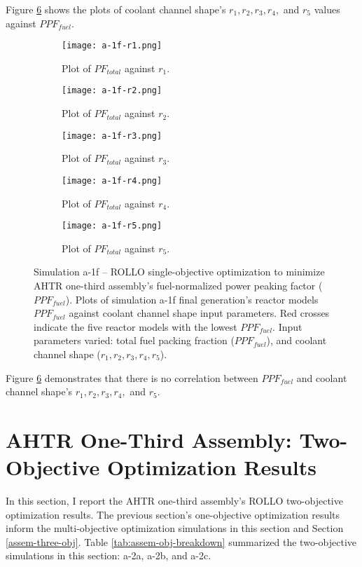 Figure \ref{fig:a-1f} shows the plots of coolant channel shape's 
$r_1, r_2, r_3, r_4,$ and $r_5$ values against $PPF_{fuel}$. 
\begin{figure}[htbp!]
    \centering
    \begin{subfigure}{0.49\textwidth}
        \texttt{[image: a-1f-r1.png]}
        \caption{Plot of $PF_{total}$ against $r_1$.}
        \label{fig:a-1f-r1} 
    \end{subfigure}
    \begin{subfigure}{0.49\textwidth}
        \texttt{[image: a-1f-r2.png]}
        \caption{Plot of $PF_{total}$ against $r_2$.}
        \label{fig:a-1f-r2} 
    \end{subfigure}
    \begin{subfigure}{0.49\textwidth}
        \texttt{[image: a-1f-r3.png]}
        \caption{Plot of $PF_{total}$ against $r_3$.}
        \label{fig:a-1f-r3} 
    \end{subfigure}
    \begin{subfigure}{0.49\textwidth}
        \texttt{[image: a-1f-r4.png]}
        \caption{Plot of $PF_{total}$ against $r_4$.}
        \label{fig:a-1f-r4} 
    \end{subfigure}
    \begin{subfigure}{0.49\textwidth}
        \texttt{[image: a-1f-r5.png]}
        \caption{Plot of $PF_{total}$ against $r_5$.}
        \label{fig:a-1f-r5} 
    \end{subfigure}
    \caption{Simulation a-1f -- ROLLO single-objective optimization to minimize 
    AHTR one-third assembly's fuel-normalized power peaking factor ($PPF_{fuel}$). 
    Plots of simulation a-1f final generation's reactor models $PPF_{fuel}$ against 
    coolant channel shape input parameters. 
    Red crosses indicate the five reactor models with the lowest $PPF_{fuel}$.
    Input parameters varied: total fuel packing fraction 
    ($PPF_{fuel}$), and coolant channel shape ($r_1, r_2, r_3, r_4, r_5$).}
    \label{fig:a-1f}
\end{figure}

Figure \ref{fig:a-1f} demonstrates that there is no correlation between $PPF_{fuel}$ 
and coolant channel shape's $r_1, r_2, r_3, r_4,$ and $r_5$. 

\pagebreak
\section{AHTR One-Third Assembly: Two-Objective Optimization Results}
In this section, I report the \gls{AHTR} one-third assembly's \gls{ROLLO} two-objective 
optimization results. 
The previous section's one-objective optimization results inform the multi-objective 
optimization simulations in this section and Section \ref{assem-three-obj}.
Table \ref{tab:assem-obj-breakdown} summarized the two-objective simulations in this 
section: a-2a, a-2b, and a-2c.

